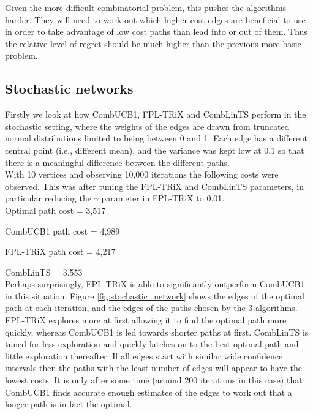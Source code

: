 Given the more difficult combinatorial problem, this pushes the algorithms harder. They will need to work out which higher cost edges are beneficial to use in order to take advantage of low cost paths than lead into or out of them. Thus the relative level of regret should be much higher than the previous more basic problem.\\

\subsection{Stochastic networks}

Firstly we look at how CombUCB1, FPL-TRiX and CombLinTS perform in the stochastic setting, where the weights of the edges are drawn from truncated normal distributions limited to being between 0 and 1. Each edge has a different central point (i.e., different mean), and the variance was kept low at 0.1 so that there is a meaningful difference between the different paths.\\

With 10 vertices and observing 10,000 iterations the following costs were observed. This was after tuning the FPL-TRiX and CombLinTS parameters, in particular reducing the $\gamma$ parameter in FPL-TRiX to 0.01.\\

Optimal path cost = 3,517

CombUCB1 path cost = 4,989

FPL-TRiX path cost = 4,217

CombLinTS = 3,553\\

Perhaps surprisingly, FPL-TRiX is able to significantly outperform CombUCB1 in this situation. Figure \ref{fig:stochastic_network} shows the edges of the optimal path at each iteration, and the edges of the paths chosen by the 3 algorithms. FPL-TRiX explores more at first allowing it to find the optimal path more quickly, whereas CombUCB1 is led towards shorter paths at first. CombLinTS is tuned for less exploration and quickly latches on to the best optimal path and little exploration thereafter. If all edges start with similar wide confidence intervals then the paths with the least number of edges will appear to have the lowest costs. It is only after some time (around 200 iterations in this case) that CombUCB1 finds accurate enough estimates of the edges to work out that a longer path is in fact the optimal.\\

